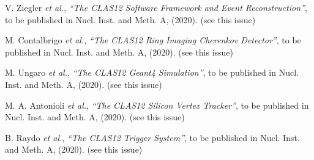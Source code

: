 \begin{thebibliography}{99}
V. Ziegler {\it et al.}, {\it ``The CLAS12 Software Framework and Event Reconstruction''}, to be published in Nucl.
Inst. and Meth. A, (2020). (see this issue)
  
M. Contalbrigo {\it et al.}, {\it ``The CLAS12 Ring Imaging Cherenkov Detector''}, to be published in Nucl. Inst.
and Meth. A, (2020). (see this issue)
  
M. Ungaro {\it et al.}, {\it ``The CLAS12 Geant4 Simulation''}, to be published in Nucl. Inst.
and Meth. A, (2020). (see this issue)
  
M. A. Antonioli {\it et al.}, {\it ``The CLAS12 Silicon Vertex Tracker''}, to be published in Nucl. Inst.
and Meth. A, (2020). (see this issue)
  
B. Raydo {\it et al.}, {\it ``The CLAS12 Trigger System''}, to be published in Nucl. Inst. and Meth. A, (2020).
(see this issue)
  
\end{thebibliography}


